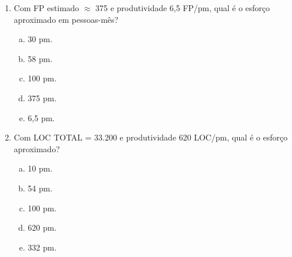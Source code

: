 \documentclass{beamer}
\begin{document}
\begin{frame}
    \begin{enumerate}
        \justifying
        \setcounter{enumi}{26}
        \item<1-2> Com FP estimado $\approx$ 375 e produtividade 6,5 FP/pm, qual é o esforço aproximado em pessoas-mês?
        \begin{enumerate}[a)]
            \justifying
            \item<1-2> 30 pm.
            \item<1-2> \alert<2>{58 pm}.
            \item<1-2> 100 pm.
            \item<1-2> 375 pm.
            \item<1-2> 6,5 pm.
        \end{enumerate}
        \item<3-4> Com LOC TOTAL = 33.200 e produtividade 620 LOC/pm, qual é o esforço aproximado?
        \begin{enumerate}[a)]
            \justifying
            \item<3-4> 10 pm.
            \item<3-4> \alert<4>{54 pm}.
            \item<3-4> 100 pm.
            \item<3-4> 620 pm.
            \item<3-4> 332 pm.
        \end{enumerate}
    \end{enumerate}
\end{frame}
\end{document}
